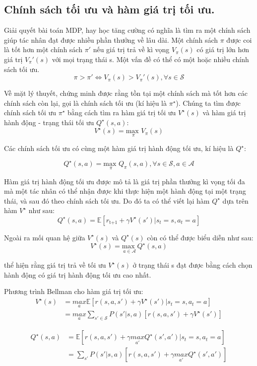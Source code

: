 \documentclass{uetgraduation}
\begin{document}
\subsection{Chính sách tối ưu và hàm giá trị tối ưu.}
Giải quyết bài toán MDP, hay học tăng cường có nghĩa là tìm ra một chính sách giúp tác nhân đạt được nhiều phần thưởng về lâu dài. Một chính sách $\pi$ được coi là tốt hơn một chính sách $\pi'$ nếu giá
trị trả về kì vọng $V_\pi(s)$ có giá trị lớn hơn giá trị $V_\pi'(s)$ với mọi trạng thái s. Một vấn đề có thể có một hoặc nhiều chính sách tối ưu.
\[
\pi > \pi' \iff V_\pi(s) > V_\pi'(s), \forall s \in \mathcal{S}
\]

Về mặt lý thuyết, chứng minh được rằng tồn tại một chính sách mà tốt hơn các chính sách còn lại, gọi là chính sách tối ưu (kí hiệu là $\pi^\star$). Chúng ta tìm được chính sách tối ưu $\pi^\star$ bằng
cách tìm ra hàm giá trị tối ưu $V^\star(s)$ và hàm giá trị hành động - trạng thái tối ưu $Q^\star (s, a)$:
\[
V^\star (s) = \underset{\pi}{\text{max }} V_\pi(s)
\]

Các chính sách tối ưu có cùng một hàm giá trị hành động tối ưu, kí hiệu là $Q^\star$:

\[
Q^\star (s, a) = \underset{\pi}{\text{max }} Q_\pi(s, a), \forall s \in \mathcal{S}, a \in \mathcal{A}
\]

Hàm giá trị hành động tối ưu được mô tả là giá trị phần thưởng kì vọng tối đa mà một tác nhân có thể nhận được khi thực hiện một hành động tại một trạng thái, và sau đó theo chính sách tối ưu. Do đó ta có
thể viết lại hàm $Q^\star$ dựa trên hàm $V^\star$ như sau:
\[
Q^\star (s, a) = \mathbb{E} [r_\text{t+1} + \gamma V^\star (s') | s_t = s, a_t = a]
\]

Ngoài ra mối quan hệ giữa $V^\star (s)$ và $Q^\star (s)$ còn có thể được biểu diễn như sau:
\[
V^\star (s) = \underset{a \in \mathcal{A}}{\text{max }} Q^\star (s, a)
\]

thể hiện rằng giá trị trả về tối ưu $V^\star (s)$ ở trạng thái s đạt được bằng cách chọn hành động có giá trị hành động tối ưu cao nhất.

Phương trình Bellman cho hàm giá trị tối ưu:
\begin{align*}
    V^\star (s) &= \underset{a}{max } \mathbb{E} [r(s, a, s') + \gamma V^\star (s') | s_t = s, a_t = a] \\
    &= \underset{a}{max } \sum_{s' \in \mathcal{S}} P(s' | s, a) [r(s, a, s') + \gamma V^\star (s')]
\end{align*}

\begin{align*}
    Q^\star (s, a) &= \mathbb{E} [r(s, a, s') + \gamma \underset{a'}{ max } Q^\star (s', a') | s_t = s, a_t = a] \\
    &= \sum_{s'} P(s' | s, a) [r(s, a, s') + \gamma \underset{a'}{max } Q^\star (s', a')]
\end{align*}
\end{document}
